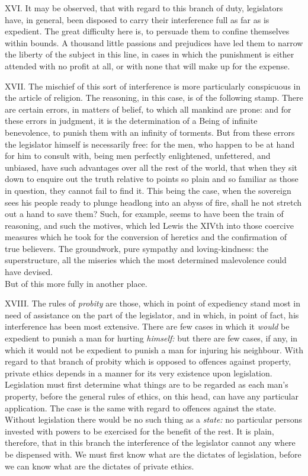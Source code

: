 \documentclass[12pt]{report}
\begin{document}
XVI. It may be observed, that with regard to this branch of duty,
legislators have, in general, been disposed to carry their interference
full as far as is expedient. The great difficulty here is, to persuade
them to confine themselves within bounds. A thousand little passions and
prejudices have led them to narrow the liberty of the subject in this
line, in cases in which the punishment is either attended with no profit
at all, or with none that will make up for the expense.

XVII. The mischief of this sort of interference is more particularly
conspicuous in the article of religion. The reasoning, in this case, is
of the following stamp. There are certain errors, in matters of belief,
to which all mankind are prone: and for these errors in judgment, it is
the determination of a Being of infinite benevolence, to punish them
with an infinity of torments. But from these errors the legislator
himself is necessarily free: for the men, who happen to be at hand for
him to consult with, being men perfectly enlightened, unfettered, and
unbiased, have such advantages over all the rest of the world, that when
they sit down to enquire out the truth relative to points so plain and
so familiar as those in question, they cannot fail to find it. This
being the case, when the sovereign sees his people ready to plunge
headlong into an abyss of fire, shall he not stretch out a hand to save
them? Such, for example, seems to have been the train of reasoning, and
such the motives, which led Lewis the XIVth into those coercive measures
which he took for the conversion of heretics and the confirmation of
true believers. The groundwork, pure sympathy and loving-kindness: the
superstructure, all the miseries which the most determined malevolence
could have devised.\\
But of this more fully in another place.

XVIII. The rules of \emph{probity} are those, which in point of
expediency stand most in need of assistance on the part of the
legislator, and in which, in point of fact, his interference has been
most extensive. There are few cases in which it \emph{would} be
expedient to punish a man for hurting \emph{himself:} but there are few
cases, if any, in which it would not be expedient to punish a man for
injuring his neighbour. With regard to that branch of probity which is
opposed to offences against property, private ethics depends in a manner
for its very existence upon legislation. Legislation must first
determine what things are to be regarded as each man's property, before
the general rules of ethics, on this head, can have any particular
application. The case is the same with regard to offences against the
state. Without legislation there would be no such thing as a
\emph{state:} no particular persons invested with powers to be exercised
for the benefit of the rest. It is plain, therefore, that in this branch
the interference of the legislator cannot any where be dispensed with.
We must first know what are the dictates of legislation, before we can
know what are the dictates of private ethics.
\end{document}
